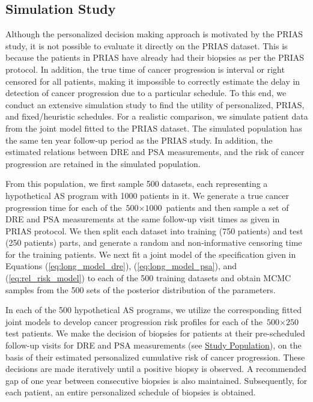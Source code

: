 \documentclass[Afour,sagev,times]{sagej}
\begin{document}
\subsection{Simulation Study}
\label{subsec:sim_study}
Although the personalized decision making approach is motivated by the PRIAS study, it is not possible to evaluate it directly on the PRIAS dataset. This is because the patients in PRIAS have already had their biopsies as per the PRIAS protocol. In addition, the true time of cancer progression is interval or right censored for all patients, making it impossible to correctly estimate the delay in detection of cancer progression due to a particular schedule. To this end, we conduct an extensive simulation study to find the utility of personalized, PRIAS, and fixed/heuristic schedules. For a realistic comparison, we simulate patient data from the joint model fitted to the PRIAS dataset. The simulated population has the same ten year follow-up period as the PRIAS study. In addition, the estimated relations between DRE and PSA measurements, and the risk of cancer progression are retained in the simulated population.

From this population, we first sample 500 datasets, each representing a hypothetical AS program with 1000 patients in it. We generate a true cancer progression time for each of the ${\mbox{500} \times \mbox{1000}}$ patients and then sample a set of DRE and PSA measurements at the same follow-up visit times as given in PRIAS protocol. We then split each dataset into training (750 patients) and test (250 patients) parts, and generate a random and non‐informative censoring time for the training patients. We next fit a joint model of the specification given in Equations (\ref{eq:long_model_dre}), (\ref{eq:long_model_psa}), and (\ref{eq:rel_risk_model}) to each of the 500 training datasets and obtain MCMC samples from the 500 sets of the posterior distribution of the parameters. 

In each of the 500 hypothetical AS programs, we utilize the corresponding fitted joint models to develop cancer progression risk profiles for each of the ${\mbox{500} \times \mbox{250}}$ test patients. We make the decision of biopsies for patients at their pre-scheduled follow-up visits for DRE and PSA measurements (see \hyperref[subsec:study_population]{Study Population}), on the basis of their estimated personalized cumulative risk of cancer progression. These decisions are made iteratively until a positive biopsy is observed. A recommended gap of one year between consecutive biopsies\cite{bokhorst2015compliance} is also maintained. Subsequently, for each patient, an entire personalized schedule of biopsies is obtained.
\end{document}
